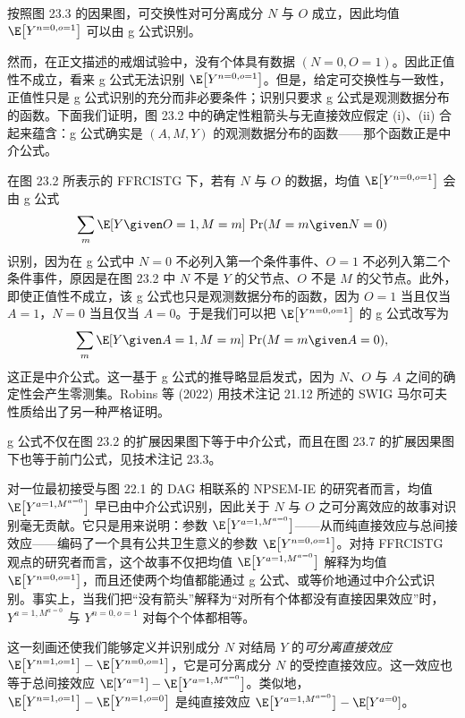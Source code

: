 \begin{techpoint}
\setlength{\parindent}{2em}
按照图 23.3 的因果图，可交换性对可分离成分 $N$ 与 $O$ 成立，因此均值 $\E\big[Y^{n=0,o=1}\big]$ 可以由 g 公式识别。

然而，在正文描述的戒烟试验中，没有个体具有数据 $(N=0,O=1)$。因此正值性不成立，看来 g 公式无法识别 $\E\big[Y^{n=0,o=1}\big]$。但是，给定可交换性与一致性，正值性只是 g 公式识别的充分而非必要条件；识别只要求 g 公式是观测数据分布的函数。下面我们证明，图 23.2 中的确定性粗箭头与无直接效应假定 (i)、(ii) 合起来蕴含：g 公式确实是 $(A,M,Y)$ 的观测数据分布的函数——那个函数正是中介公式。

在图 23.2 所表示的 FFRCISTG 下，若有 $N$ 与 $O$ 的数据，均值 $\E\big[Y^{n=0,o=1}\big]$ 会由 g 公式
\[
\sum_m \E[Y\given O=1,M=m]\,\Pr(M=m\given N=0)
\]
识别，因为在 g 公式中 $N=0$ 不必列入第一个条件事件、$O=1$ 不必列入第二个条件事件，原因是在图 23.2 中 $N$ 不是 $Y$ 的父节点、$O$ 不是 $M$ 的父节点。此外，即使正值性不成立，该 g 公式也只是观测数据分布的函数，因为 $O=1$ 当且仅当 $A=1$，$N=0$ 当且仅当 $A=0$。于是我们可以把 $\E\big[Y^{n=0,o=1}\big]$ 的 g 公式改写为
\[
\sum_m \E[Y\given A=1,M=m]\,\Pr(M=m\given A=0),
\]
这正是中介公式。这一基于 g 公式的推导略显启发式，因为 $N$、$O$ 与 $A$ 之间的确定性会产生零测集。Robins 等 (2022) 用技术注记 21.12 所述的 SWIG 马尔可夫性质给出了另一种严格证明。

g 公式不仅在图 23.2 的扩展因果图下等于中介公式，而且在图 23.7 的扩展因果图下也等于前门公式，见技术注记 23.3。
\end{techpoint}

对一位最初接受与图 22.1 的 DAG 相联系的 NPSEM-IE 的研究者而言，均值 $\E\big[Y^{a=1,M^{a=0}}\big]$ 早已由中介公式识别，因此关于 $N$ 与 $O$ 之可分离效应的故事对识别毫无贡献。它只是用来说明：参数 $\E\big[Y^{a=1,M^{a=0}}\big]$——从而纯直接效应与总间接效应——编码了一个具有公共卫生意义的参数 $\E\big[Y^{n=0,o=1}\big]$。对持 FFRCISTG 观点的研究者而言，这个故事不仅把均值 $\E\big[Y^{a=1,M^{a=0}}\big]$ 解释为均值 $\E\big[Y^{n=0,o=1}\big]$，而且还使两个均值都能通过 g 公式、或等价地通过中介公式识别。事实上，当我们把“没有箭头”解释为“对所有个体都没有直接因果效应”时，$Y^{a=1,M^{a=0}}$ 与 $Y^{n=0,o=1}$ 对每个个体都相等。

这一刻画还使我们能够定义并识别成分 $N$ 对结局 $Y$ 的\emph{可分离直接效应} $\E\big[Y^{n=1,o=1}\big]-\E\big[Y^{n=0,o=1}\big]$，它是可分离成分 $N$ 的受控直接效应。这一效应也等于总间接效应 $\E[Y^{a=1}]-\E\big[Y^{a=1,M^{a=0}}\big]$。类似地，$\E\big[Y^{n=1,o=1}\big]-\E\big[Y^{n=1,o=0}\big]$ 是纯直接效应 $\E\big[Y^{a=1,M^{a=0}}\big]-\E[Y^{a=0}]$。

